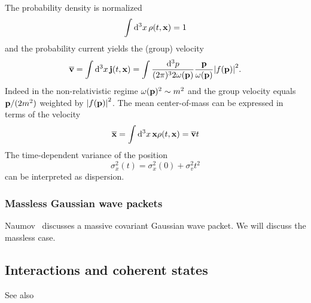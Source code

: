 The probability density is normalized
\begin{equation}
	\int\dd[3]{x}
	\rho(t,\vb{x})
	=
	1
\end{equation}
and the probability current yields the (group) velocity
\begin{equation}
	\overline{\vb{v}}
	=
	\int\dd[3]{x}
	\vb{j}(t,\vb{x})
	=
	\int\frac{\dd[3]{p}}{(2\pi)^32\omega(\vb{p})}
	\frac{\vb{p}}{\omega(\vb{p})}
	\abs{f(\vb{p})}^2
	\label{qkg:group_velocity}.
\end{equation}
Indeed in the non-relativistic regime $\omega(\vb{p})^2\sim m^2$
and the group velocity equals $\vb{p}/(2m^2)$ weighted by $\abs{f(\vb{p})}^2$.
The mean center-of-mass can be expressed in terms of the velocity
\begin{equation}
	\overline{\vb{x}}
	=
	\int\dd[3]{x}\vb{x}\rho(t,\vb{x})
	=
	\overline{\vb{v}}t
\end{equation}
The time-dependent variance of the position
\begin{equation}
	\sigma_x^2(t)
	=
	\sigma_x^2(0)
	+
	\sigma_v^2t^2
\end{equation}
can be interpreted as dispersion.

\subsubsection{Massless Gaussian wave packets}

Naumov~\cite{Naumov2013} discusses a massive covariant Gaussian wave packet.
We will discuss the massless case.

\subsection{Interactions and coherent states}

See also \cite{Itzykson2012}
